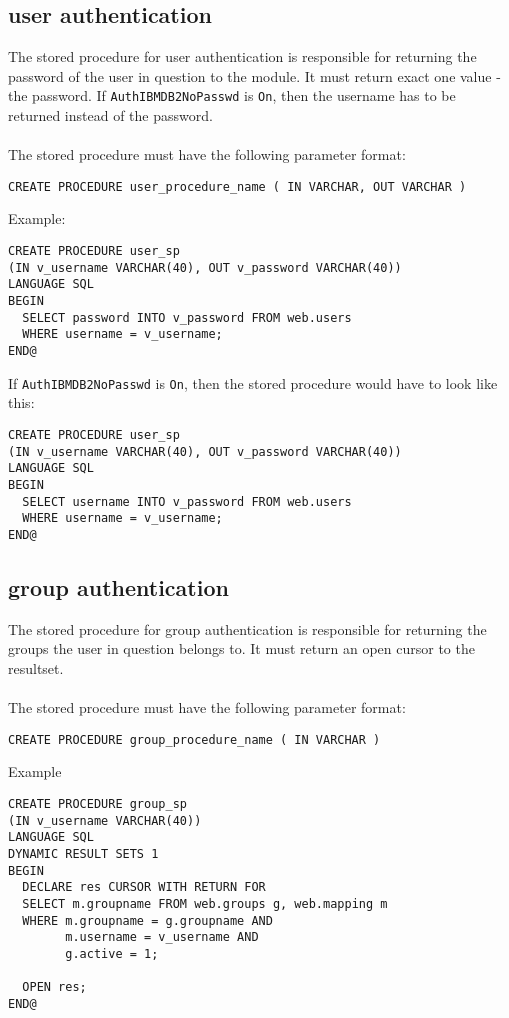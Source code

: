 \documentclass[11pt,a4paper]{article}
\begin{document}
\begin{appendix}
\subsection{user authentication} \label{usersp}
The stored procedure for user authentication is responsible for returning the password of the user in question to the module. It must return exact one value - the password. If {\tt AuthIBMDB2NoPasswd} is {\tt On}, then the username has to be returned instead of the password.\\
\\
The stored procedure must have the following parameter format:
\begin{verbatim}
CREATE PROCEDURE user_procedure_name ( IN VARCHAR, OUT VARCHAR )
\end{verbatim}
Example:
\begin{verbatim}
CREATE PROCEDURE user_sp
(IN v_username VARCHAR(40), OUT v_password VARCHAR(40))
LANGUAGE SQL
BEGIN
  SELECT password INTO v_password FROM web.users 
  WHERE username = v_username;
END@
\end{verbatim}
If {\tt AuthIBMDB2NoPasswd} is {\tt On}, then the stored procedure would have to look like this:
\begin{verbatim}
CREATE PROCEDURE user_sp
(IN v_username VARCHAR(40), OUT v_password VARCHAR(40))
LANGUAGE SQL
BEGIN
  SELECT username INTO v_password FROM web.users 
  WHERE username = v_username;
END@
\end{verbatim}
\newpage
\hypertarget{hgroupsp}{}
\subsection{group authentication} \label{groupsp}
The stored procedure for group authentication is responsible for returning the groups the user in question belongs to. It must return an open cursor to the resultset.\\
\\
The stored procedure must have the following parameter format:
\begin{verbatim}
CREATE PROCEDURE group_procedure_name ( IN VARCHAR )
\end{verbatim}
Example
\begin{verbatim}
CREATE PROCEDURE group_sp
(IN v_username VARCHAR(40))
LANGUAGE SQL
DYNAMIC RESULT SETS 1
BEGIN
  DECLARE res CURSOR WITH RETURN FOR
  SELECT m.groupname FROM web.groups g, web.mapping m 
  WHERE m.groupname = g.groupname AND
        m.username = v_username AND
        g.active = 1;

  OPEN res;
END@
\end{verbatim}

\end{appendix}
\end{document}

